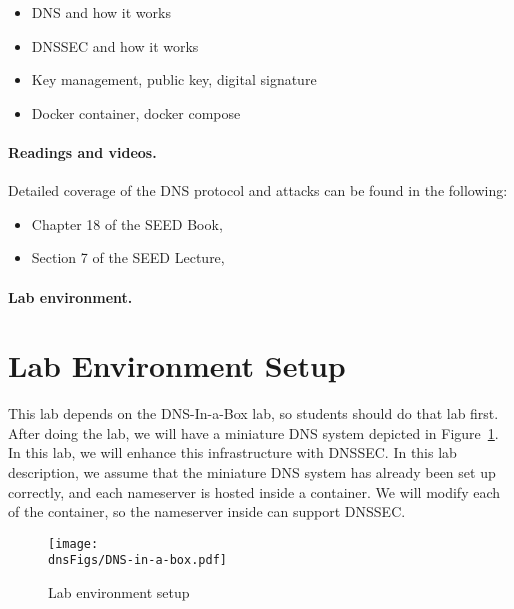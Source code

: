 \begin{itemize}[noitemsep]
\item DNS and how it works
\item DNSSEC and how it works
\item Key management, public key, digital signature 
\item Docker container, docker compose
\end{itemize}


\paragraph{Readings and videos.}
Detailed coverage of the DNS protocol and attacks can be found in the following:

\begin{itemize}
\item Chapter 18 of the SEED Book, \seedbook
\item Section 7 of the SEED Lecture, \seedisvideo
\end{itemize}


\paragraph{Lab environment.} 
\seedenvironmentB
\nodependency




\section{Lab Environment Setup} 


This lab depends on the DNS-In-a-Box lab, 
so students should do that lab first. After doing the lab,
we will have a miniature DNS system depicted in 
Figure~\ref{dnssec:fig:dns-in-a-box}. In this lab, we will
enhance this infrastructure with DNSSEC. 
In this lab description, we assume that the miniature DNS system 
has already been set up
correctly, and each nameserver is hosted inside a container. 
We will modify each of the container, so the nameserver inside 
can support DNSSEC.


\begin{figure}[htb]
\begin{center}
\texttt{[image: \\dnsFigs/DNS-in-a-box.pdf]}
\end{center}
\caption{Lab environment setup}
\label{dnssec:fig:dns-in-a-box}
\end{figure}
 



